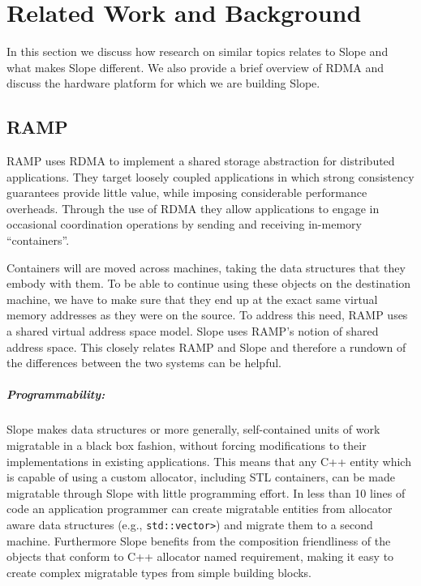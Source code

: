 \chapter{Related Work and Background}
\label{chap:related}
In this section we discuss how research on similar topics relates to
Slope and what makes Slope different. We also provide a brief overview of
RDMA and discuss the hardware platform for which we are building Slope.

\section{RAMP}
RAMP\cite{memon2018ramp} uses RDMA to implement a shared storage abstraction
for distributed applications. They target loosely coupled applications in which
strong consistency guarantees provide little value, while imposing considerable
performance overheads. Through the use of RDMA they allow applications to engage in
occasional coordination operations by sending and receiving in-memory
``containers''.

Containers will are moved across machines, taking the data structures
that they embody with them. To be able to continue using these objects on the
destination machine, we have to make sure that they end up at the exact same
virtual memory addresses as they were on the source. To address this need,
RAMP uses a shared virtual address space model. Slope uses RAMP's notion of
shared address space. This closely relates
RAMP and Slope and therefore a rundown of the differences between the two
systems can be helpful.

\paragraph{Programmability:}

Slope makes data structures or more generally, self-contained units of
work migratable in a black box fashion, without forcing modifications to
their implementations in existing applications.
This means that any C++ entity which is capable of using a custom
allocator, including STL containers, can be made migratable through Slope
with little programming effort. In less than 10 lines of code an application
programmer can create
migratable entities from
allocator aware data structures (e.g., \texttt{std::vector>}) and migrate them to
a second machine. Furthermore Slope benefits
from the composition friendliness of the objects that conform to C++ 
allocator named requirement, making it easy to create complex migratable
types from simple building blocks.

